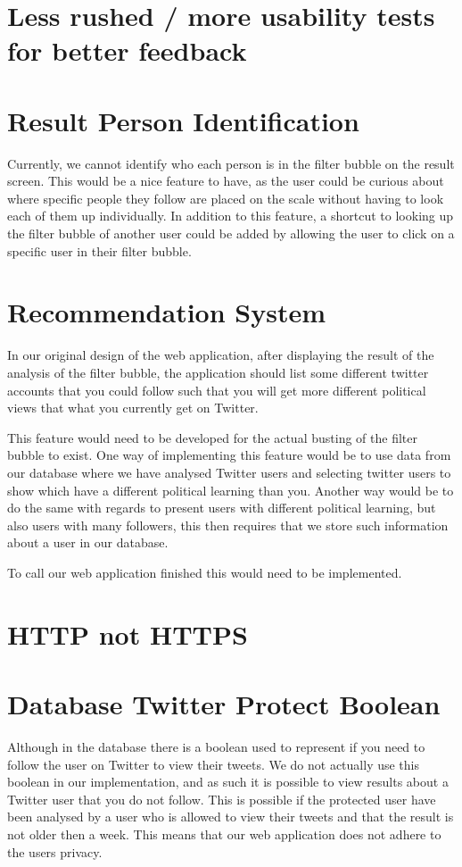 \section*{Less rushed / more usability tests for better feedback}

\section*{Result Person Identification}
Currently, we cannot identify who each person is in the filter bubble on the
result screen. This would be a nice feature to have, as the user could be
curious about where specific people they follow are placed on the scale without
having to look each of them up individually. In addition to this feature, a
shortcut to looking up the filter bubble of another user could be added by
allowing the user to click on a specific user in their filter bubble.


\section*{Recommendation System}
In our original design of the web application, after displaying the result of
the analysis of the filter bubble, the application should list some different
twitter accounts that you could follow such that you will get more different
political views that what you currently get on Twitter. \nl

This feature would need to be developed for the actual busting of the filter
bubble to exist. One way of implementing this feature would be to use data from
our database where we have analysed Twitter users and selecting twitter users to
show which have a different political learning than you. Another way would be to
do the same with regards to present users with different political learning, but
also users with many followers, this then requires that we store such
information about a user in our database.\nl

To call our web application finished this would need to be implemented.

\section*{HTTP not HTTPS}

\section*{Database Twitter Protect Boolean}\label{sec:twitterProtect}
Although in the database there is a boolean used to represent if you need to
follow the user on Twitter to view their tweets. We do not actually use this
boolean in our implementation, and as such it is possible to view results about
a Twitter user that you do not follow. This is possible if the protected user
have been analysed by a user who is allowed to view their tweets and that the
result is not older then a week. This means that our web application does not
adhere to the users privacy. \nl

